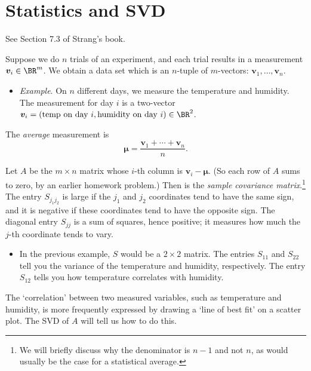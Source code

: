 \documentclass[10pt]{amsart}
\theoremstyle{mythm}
\theoremstyle{definition}
\theoremstyle{myrmk}
\begin{document}
	\thispagestyle{fancy}
	
	\section{Statistics and SVD} 
	
	See Section 7.3 of Strang's book. 
	
	Suppose we do $n$ trials of an experiment, and each trial results in a measurement $\bm{v}_i \in \BR^m$. We obtain a data set which is an $n$-tuple of $m$-vectors: $\bm{v}_1, \ldots, \bm{v}_n$. 
	\begin{itemize}
		\item \emph{Example}. On $n$ different days, we measure the temperature and humidity. The measurement for day $i$ is a two-vector $\bm{v}_i = (\text{temp on day } i, \text{humidity on day } i) \in \BR^2$. 
	\end{itemize}
	The \emph{average} measurement is 
	\[
		\bm{\mu} = \frac{\bm{v}_1 + \cdots + \bm{v}_n}{n}. 
	\]
		
	Let $A$ be the $m \times n$ matrix whose $i$-th column is $\bm{v}_i - \bm{\mu}$. (So each row of $A$ sums to zero, by an earlier homework problem.) Then 
	is the \emph{sample covariance matrix}.\footnote{We will briefly discuss why the denominator is $n-1$ and not $n$, as would usually be the case for a statistical average.} The entry $S_{j_1j_2}$ is large if the $j_1$ and $j_2$ coordinates tend to have the same sign, and it is negative if these coordinates tend to have the opposite sign. The diagonal entry $S_{jj}$ is a sum of squares, hence positive; it measures how much the $j$-th coordinate tends to vary. 
	\begin{itemize}
		\item In the previous example, $S$ would be a $2 \times 2$ matrix. The entries $S_{11}$ and $S_{22}$ tell you the variance of the temperature and humidity, respectively. The entry $S_{12}$ tells you how temperature correlates with humidity. 
	\end{itemize}
	The `correlation' between two measured variables, such as temperature and humidity, is more frequently expressed by drawing a `line of best fit' on a scatter plot. The SVD of $A$ will tell us how to do this. 
	
\end{document}
